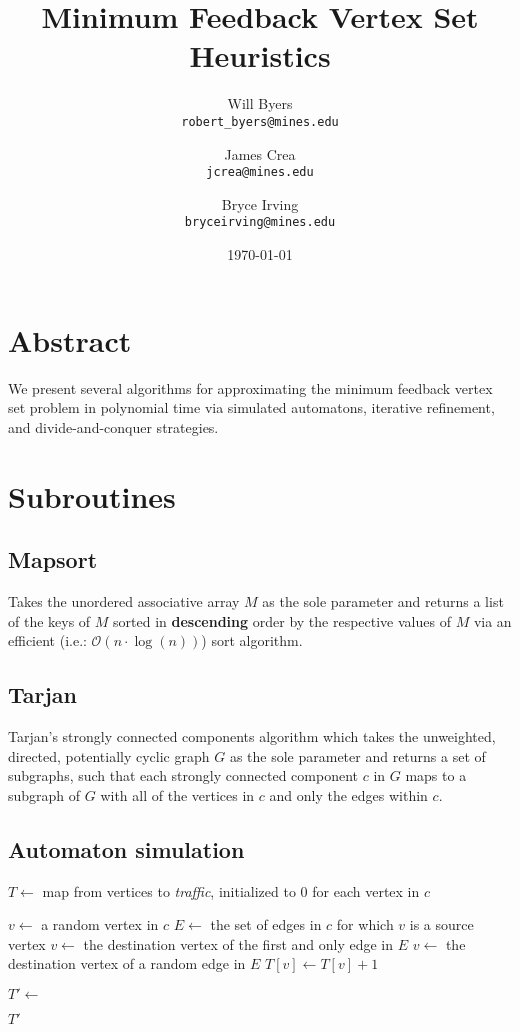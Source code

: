 \documentclass{article}
\title{Minimum Feedback Vertex Set Heuristics}
\author{
  Will Byers\\
  \texttt{robert\_byers@mines.edu}
  \and
  James Crea\\
  \texttt{jcrea@mines.edu}
  \and
  Bryce Irving\\
  \texttt{bryceirving@mines.edu}
}
\date{\today}
\begin{document}
\maketitle

\section*{Abstract}

We present several algorithms for approximating the minimum feedback vertex set problem in polynomial time via simulated automatons, iterative refinement, and divide-and-conquer strategies.

\section*{Subroutines}

\subsection*{Mapsort}

Takes the unordered associative array $M$ as the sole parameter and returns a list of the keys of $M$ sorted in \textbf{descending} order by the respective values of $M$ via an efficient (i.e.: $\mathcal{O}(n \cdot \log(n))$) sort algorithm.

\subsection*{Tarjan}

Tarjan's strongly connected components algorithm which takes the unweighted, directed, potentially cyclic graph $G$ as the sole parameter and returns a set of subgraphs, such that each strongly connected component $c$ in $G$ maps to a subgraph of $G$ with all of the vertices in $c$ and only the edges within $c$.

\subsection*{Automaton simulation}

\label{alg:simulate}
\begin{algorithmic}[1]
  \State $T \gets$ map from vertices to \textit{traffic}, initialized to $0$ for each vertex in $c$

   
  \State $v \gets$ a random vertex in $c$
  \State $E \gets$ the set of edges in $c$ for which $v$ is a source vertex
  \State $v \gets$ the destination vertex of the first and only edge in $E$
  \Else
  \State $v \gets$ the destination vertex of a random edge in $E$
  \EndIf
  \State $T[v] \gets T[v] + 1$
  \EndFor
  \EndFor

  \State $T' \gets$ 

  \State \Return $T'$
  \EndFunction
\end{algorithmic}
\end{document}

